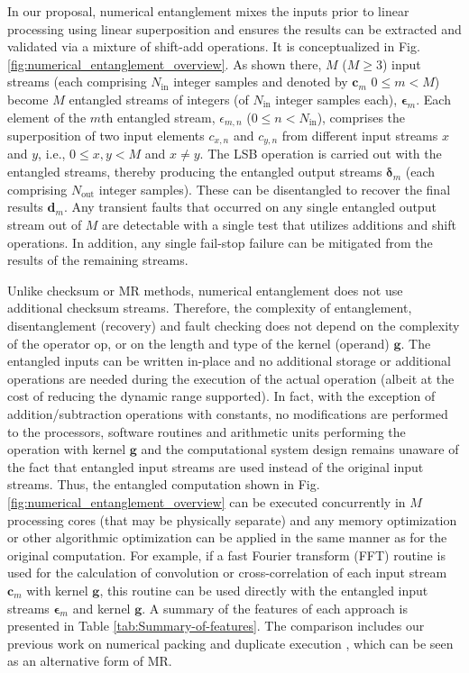 \documentclass[twocolumn,english,onecolumn]{IEEEtran}
\theoremstyle{plain}
\theoremstyle{plain}
\begin{document}
In our proposal, numerical entanglement mixes the inputs prior to
linear processing using linear superposition and ensures the results
can be extracted and validated via a mixture of shift-add operations.
It is conceptualized in Fig. \ref{fig:numerical_entanglement_overview}.
As shown there, $M$ ($M\geq3$) input streams (each comprising $N_{\text{in}}$
integer samples and denoted by $\mathbf{c}_{m}$ $0\leq m<M$) become
$M$ entangled streams of integers (of $N_{\text{in}}$ integer samples
each), $\boldsymbol{\epsilon}_{m}$. Each element of the $m$th entangled
stream, $\epsilon_{m,n}$ ($0\leq n<N_{\text{in}}$), comprises the
superposition of two input elements $c_{x,n}$ and $c_{y,n}$ from
different input streams $x$ and $y$, i.e., $0\leq x,y<M$ and $x\neq y.$
The LSB operation is carried out with the entangled streams, thereby
producing the entangled output streams $\boldsymbol{\delta}_{m}$
(each comprising $N_{\text{out}}$ integer samples). These can be
disentangled to recover the final results $\mathbf{\hat{d}}_{m}$.
Any transient faults that occurred on any single entangled output
stream out of $M$ are detectable with a single test that utilizes
additions and shift operations. In addition, any single fail-stop
failure can be mitigated from the results of the remaining streams. 

Unlike checksum or MR methods, numerical entanglement does not use
additional checksum streams. Therefore, the complexity of entanglement,
disentanglement (recovery) and fault checking does not depend on the
complexity of the operator $\text{op}$, or on the length and type
of the kernel (operand) $\mathbf{g}$. The entangled inputs can be
written in-place and no additional storage or additional operations
are needed during the execution of the actual operation (albeit at
the cost of reducing the dynamic range supported). In fact, with the
exception of addition/subtraction operations with constants, no modifications
are performed to the processors, software routines and arithmetic
units performing the operation with kernel $\mathbf{g}$ and the computational
system design remains unaware of the fact that entangled input streams
are used instead of the original input streams. Thus, the entangled
computation shown in Fig. \ref{fig:numerical_entanglement_overview}
can be executed concurrently in $M$ processing cores (that may be
physically separate) and any memory optimization or other algorithmic
optimization can be applied in the same manner as for the original
computation. For example, if a fast Fourier transform (FFT) routine
is used for the calculation of convolution or cross-correlation of
each input stream $\mathbf{c}_{m}$ with kernel $\mathbf{g}$, this
routine can be used directly with the entangled input streams $\boldsymbol{\epsilon}_{m}$
and kernel $\mathbf{g}$. A summary of the features of each approach
is presented in Table \ref{tab:Summary-of-features}. The comparison
includes our previous work on numerical packing and duplicate execution
\cite{anastasia2010linear,anastasia2012throughput,anam2012throughput,AnaradoIOLTS,AnaradoIOLTS15},
which can be seen as an alternative form of MR. 
\end{document}

